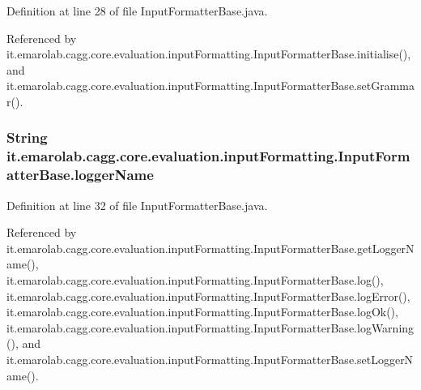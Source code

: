 Definition at line 28 of file Input\-Formatter\-Base.\-java.



Referenced by it.\-emarolab.\-cagg.\-core.\-evaluation.\-input\-Formatting.\-Input\-Formatter\-Base.\-initialise(), and it.\-emarolab.\-cagg.\-core.\-evaluation.\-input\-Formatting.\-Input\-Formatter\-Base.\-set\-Grammar().

\hypertarget{classit_1_1emarolab_1_1cagg_1_1core_1_1evaluation_1_1inputFormatting_1_1InputFormatterBase_a056ceacafad1bfa504e41694d410b6e7}{
\subsubsection[{logger\-Name}]{\setlength{\rightskip}{0pt plus 5cm}String it.\-emarolab.\-cagg.\-core.\-evaluation.\-input\-Formatting.\-Input\-Formatter\-Base.\-logger\-Name\hspace{0.3cm}{\ttfamily [private]}}}\label{classit_1_1emarolab_1_1cagg_1_1core_1_1evaluation_1_1inputFormatting_1_1InputFormatterBase_a056ceacafad1bfa504e41694d410b6e7}


Definition at line 32 of file Input\-Formatter\-Base.\-java.



Referenced by it.\-emarolab.\-cagg.\-core.\-evaluation.\-input\-Formatting.\-Input\-Formatter\-Base.\-get\-Logger\-Name(), it.\-emarolab.\-cagg.\-core.\-evaluation.\-input\-Formatting.\-Input\-Formatter\-Base.\-log(), it.\-emarolab.\-cagg.\-core.\-evaluation.\-input\-Formatting.\-Input\-Formatter\-Base.\-log\-Error(), it.\-emarolab.\-cagg.\-core.\-evaluation.\-input\-Formatting.\-Input\-Formatter\-Base.\-log\-Ok(), it.\-emarolab.\-cagg.\-core.\-evaluation.\-input\-Formatting.\-Input\-Formatter\-Base.\-log\-Warning(), and it.\-emarolab.\-cagg.\-core.\-evaluation.\-input\-Formatting.\-Input\-Formatter\-Base.\-set\-Logger\-Name().

